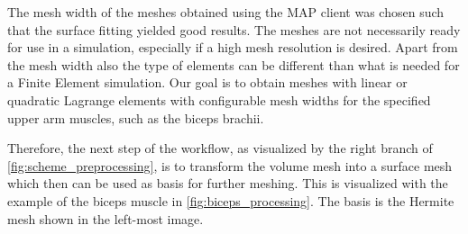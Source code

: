 The mesh width of the meshes obtained using the MAP client was chosen such that the surface fitting yielded good results. The meshes are not necessarily ready for use in a simulation, especially if a  high mesh resolution is desired. 
Apart from the mesh width also the type of elements can be different than what is needed for a Finite Element simulation. Our goal is to obtain meshes with linear or quadratic Lagrange elements with configurable mesh widths for the specified upper arm muscles, such as the biceps brachii.

Therefore, the next step of the workflow, as visualized by the right branch of \cref{fig:scheme_preprocessing}, is to transform the volume mesh into a surface mesh which then can be used as basis for further meshing. This is visualized with the example of the biceps muscle in \cref{fig:biceps_processing}. The basis is the Hermite mesh shown in the left-most image.

